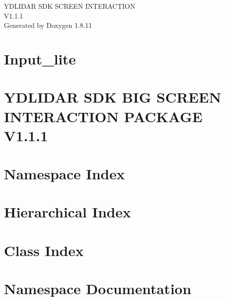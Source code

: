 \documentclass[twoside]{book}
\newcommand{\+}{\discretionary{\mbox{\scriptsize$\hookleftarrow$}}{}{}}
\newcommand{\clearemptydoublepage}{%
  \newpage{\pagestyle{empty}\cleardoublepage}%
}
\begin{document}
\hypersetup{pageanchor=false,
             bookmarksnumbered=true,
             pdfencoding=unicode
            }
\begin{titlepage}
\vspace*{7cm}
\begin{center}%
{\Large Y\+D\+L\+I\+D\+AR S\+DK S\+C\+R\+E\+EN I\+N\+T\+E\+R\+A\+C\+T\+I\+ON \\[1ex]\large V1.\+1.\+1 }\\
\vspace*{1cm}
{\large Generated by Doxygen 1.8.11}\\
\end{center}
\end{titlepage}
\clearemptydoublepage
\tableofcontents
\clearemptydoublepage
{}
\hypersetup{pageanchor=true}

\chapter{Input\+\_\+lite}
\label{md__home_yang_tmp_sdk_input_lite_README}
\hypertarget{md__home_yang_tmp_sdk_input_lite_README}{}

\chapter{Y\+D\+L\+I\+D\+AR S\+DK B\+IG S\+C\+R\+E\+EN I\+N\+T\+E\+R\+A\+C\+T\+I\+ON P\+A\+C\+K\+A\+GE V1.1.1}
\label{md__home_yang_tmp_sdk_README}
\hypertarget{md__home_yang_tmp_sdk_README}{}

\chapter{Namespace Index}

\chapter{Hierarchical Index}

\chapter{Class Index}

\chapter{Namespace Documentation}

\end{document}
